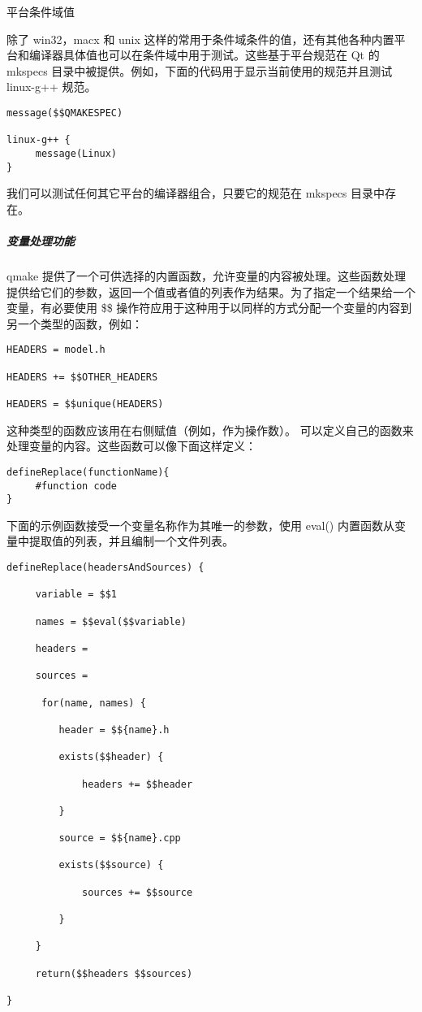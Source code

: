 平台条件域值

除了 win32，macx 和 unix
这样的常用于条件域条件的值，还有其他各种内置平台和编译器具体值也可以在条件域中用于测试。这些基于平台规范在
Qt 的 mkspecs
目录中被提供。例如，下面的代码用于显示当前使用的规范并且测试 linux-g++
规范。

\begin{verbatim}
message($$QMAKESPEC) 

linux-g++ {
     message(Linux)
}
\end{verbatim}

我们可以测试任何其它平台的编译器组合，只要它的规范在 mkspecs
目录中存在。

\subparagraph{变量处理功能}\label{ux53d8ux91cfux5904ux7406ux529fux80fd}

qmake
提供了一个可供选择的内置函数，允许变量的内容被处理。这些函数处理提供给它们的参数，返回一个值或者值的列表作为结果。为了指定一个结果给一个变量，有必要使用
\$\$
操作符应用于这种用于以同样的方式分配一个变量的内容到另一个类型的函数，例如：

\begin{verbatim}
HEADERS = model.h

HEADERS += $$OTHER_HEADERS

HEADERS = $$unique(HEADERS)
\end{verbatim}

这种类型的函数应该用在右侧赋值（例如，作为操作数）。
可以定义自己的函数来处理变量的内容。这些函数可以像下面这样定义：

\begin{verbatim}
defineReplace(functionName){
     #function code
}
\end{verbatim}

下面的示例函数接受一个变量名称作为其唯一的参数，使用 eval()
内置函数从变量中提取值的列表，并且编制一个文件列表。

\begin{verbatim}
defineReplace(headersAndSources) {

     variable = $$1

     names = $$eval($$variable)

     headers =

     sources =

      for(name, names) {

         header = $${name}.h

         exists($$header) {

             headers += $$header

         }

         source = $${name}.cpp

         exists($$source) {

             sources += $$source

         }

     }

     return($$headers $$sources)

}
\end{verbatim}

